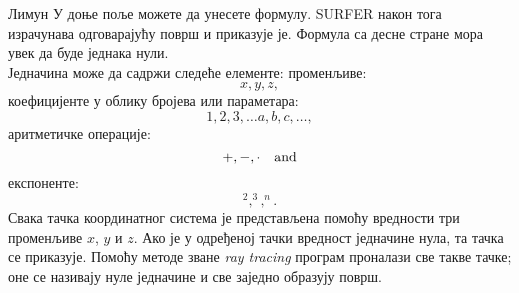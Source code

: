 \begin{surferPage}{Лимун}
У доње поље можете да унесете формулу. SURFER  након тога израчунава одговарајућу површ и приказује је. Формула са десне стране мора увек да буде једнака нули.
\\
Једначина може да садржи следеће елементе:
\newline
променљиве:
\[x, y, z, \]
коефицијенте у облику бројева или параметара:
\[1, 2, 3, \dots a, b, c, \dots, \]
аритметичке операције:
\[+,  - , \cdot \quad \textnormal{and} \]
експоненте:
\[ ^2, ^3, ^n .\]
Свака тачка координатног система је представљена помоћу вредности три променљиве $x$, $y$ и $z$. Ако је у одређеној тачки вредност једначине нула, та тачка се приказује. Помоћу методе зване \textit{ray tracing} програм проналази све такве тачке; оне се називају нуле једначине и све заједно образују површ.
\end{surferPage}
